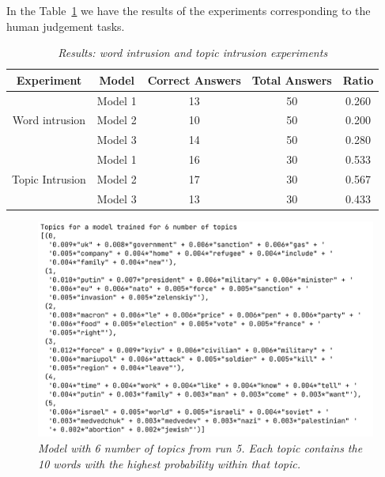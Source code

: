 \documentclass[twoside,12pt,a4paper]{article}
\begin{document}
In the Table~\ref{table:forms_results} we have the results of the experiments corresponding to the human judgement tasks.\\

\begin{table}[h!]
\centering
\begin{tabular}{c c c c c} 
\hline
Experiment & Model & Correct Answers & Total Answers & Ratio \\ [0.5ex] 
\hline
& Model 1 & 13 & 50 & 0.260\\ 
Word intrusion & Model 2 & 10 & 50 & 0.200 \\
& Model 3 & 14 & 50 & 0.280 \\ [1ex] 
\hline
& Model 1 & 16 & 30 & 0.533 \\
Topic Intrusion & Model 2 & 17 & 30 & 0.567 \\
& Model 3 & 13 & 30 & 0.433 \\ [1ex] 
\hline
\end{tabular}
\caption{\textit{Results: word intrusion and topic intrusion experiments}}
\label{table:forms_results}
\end{table}

\hfill \break
\begin{figure}[h]
\centering
\includegraphics[scale=0.4]{6_topics.png}
\caption{\textit{Model with 6 number of topics from run 5. Each topic contains the 10 words with the highest probability within that topic.}}
\label{fig:6_topics}
\end{figure}
\end{document}
